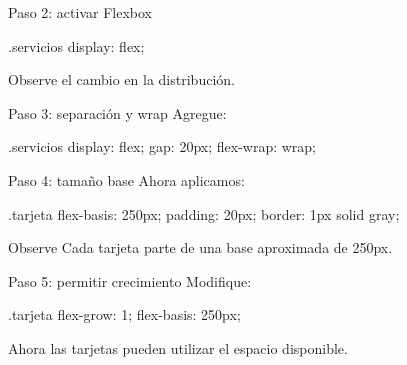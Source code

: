 \documentclass[aspectratio=169,11.5pt]{beamer}
\begin{document}
    \begin{frame}[fragile]{Paso 2: activar Flexbox}
        \begin{csscodedark}
            .servicios {
                display: flex;
            }
        \end{csscodedark}

        Observe el cambio en la distribución.
    \end{frame}

    \begin{frame}[fragile]{Paso 3: separación y wrap}
        Agregue:

        \begin{csscodedark}
            .servicios {
                display: flex;
                gap: 20px;
                flex-wrap: wrap;
            }
        \end{csscodedark}
    \end{frame}

    \begin{frame}[fragile]{Paso 4: tamaño base}
        Ahora aplicamos:

        \begin{csscodedark}
            .tarjeta {
                flex-basis: 250px;
                padding: 20px;
                border: 1px solid gray;
            }
        \end{csscodedark}

        \begin{block}{Observe}
            Cada tarjeta parte de una base
            aproximada de 250px.
        \end{block}
    \end{frame}

    \begin{frame}[fragile]{Paso 5: permitir crecimiento}
        Modifique:

        \begin{csscodedark}
            .tarjeta {
                flex-grow: 1;
                flex-basis: 250px;
            }
        \end{csscodedark}

        Ahora las tarjetas pueden utilizar
        el espacio disponible.
    \end{frame}
\end{document}
